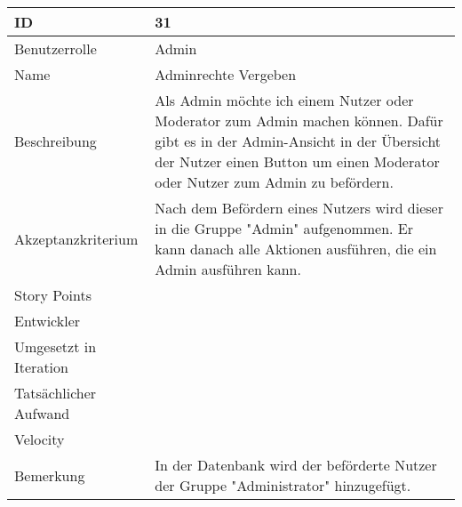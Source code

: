 \begin{tabularx}{\textwidth}{|p{}|X|}
	\hline
	ID & 31 \\
	\hline
	Benutzerrolle & Admin \\
	\hline
	Name & Adminrechte Vergeben\\
	\hline
	Beschreibung & Als Admin möchte ich einem Nutzer oder Moderator zum Admin machen können. Dafür gibt es in der Admin-Ansicht in der Übersicht der Nutzer einen Button um einen Moderator oder Nutzer zum Admin zu befördern.  \\
	\hline
	Akzeptanzkriterium & Nach dem Befördern eines Nutzers wird dieser in die Gruppe "Admin" aufgenommen. Er kann danach alle Aktionen ausführen, die ein Admin ausführen kann. \\
	\hline
	Story Points &  \\
	\hline
	Entwickler &  \\
	\hline
	Umgesetzt in Iteration & \\
	\hline
	Tatsächlicher Aufwand & \\
	\hline
	Velocity & \\
	\hline
	Bemerkung & In der Datenbank wird der beförderte Nutzer der Gruppe "Administrator" hinzugefügt. \\
	\hline
\end{tabularx}
\vspace{20pt}
